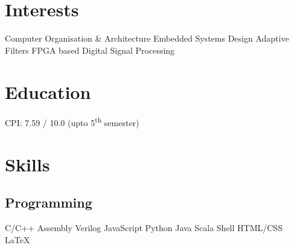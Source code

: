 \documentclass[]{deedy}
\begin{document}
\begin{minipage}[t]{0.27\textwidth}
\begin{flushleft}
%
\section{Interests}
Computer Organisation \& Architecture \textbullet{} Embedded Systems Design \textbullet{} Adaptive Filters \textbullet{} FPGA based Digital Signal Processing
\sectionsep
\section{Education}
%
CPI: 7.59 / 10.0 (upto 5\textsuperscript{th} semester)\\
\sectionsep
%
\sectionsep
%
\sectionsep
\section{Skills}
\subsection{Programming}
C/C++ \textbullet{} Assembly \textbullet{} Verilog \textbullet{} JavaScript \textbullet{} Python \textbullet{} Java \textbullet{} Scala \textbullet{} Shell \textbullet{} HTML/CSS \textbullet{}\\
\LaTeX\ 
%

\end{flushleft}
\end{minipage}
\end{document}
